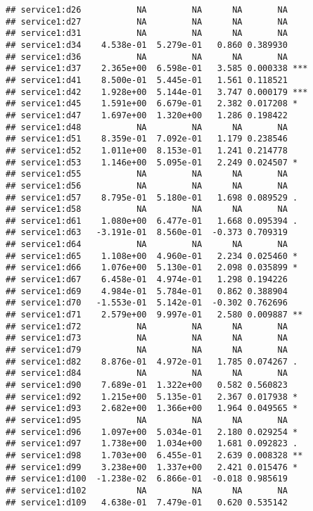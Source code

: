 \documentclass[
]{article}
\begin{document}
\begin{verbatim}
## service1:d26           NA         NA      NA       NA    
## service1:d27           NA         NA      NA       NA    
## service1:d31           NA         NA      NA       NA    
## service1:d34    4.538e-01  5.279e-01   0.860 0.389930    
## service1:d36           NA         NA      NA       NA    
## service1:d37    2.365e+00  6.598e-01   3.585 0.000338 ***
## service1:d41    8.500e-01  5.445e-01   1.561 0.118521    
## service1:d42    1.928e+00  5.144e-01   3.747 0.000179 ***
## service1:d45    1.591e+00  6.679e-01   2.382 0.017208 *  
## service1:d47    1.697e+00  1.320e+00   1.286 0.198422    
## service1:d48           NA         NA      NA       NA    
## service1:d51    8.359e-01  7.092e-01   1.179 0.238546    
## service1:d52    1.011e+00  8.153e-01   1.241 0.214778    
## service1:d53    1.146e+00  5.095e-01   2.249 0.024507 *  
## service1:d55           NA         NA      NA       NA    
## service1:d56           NA         NA      NA       NA    
## service1:d57    8.795e-01  5.180e-01   1.698 0.089529 .  
## service1:d58           NA         NA      NA       NA    
## service1:d61    1.080e+00  6.477e-01   1.668 0.095394 .  
## service1:d63   -3.191e-01  8.560e-01  -0.373 0.709319    
## service1:d64           NA         NA      NA       NA    
## service1:d65    1.108e+00  4.960e-01   2.234 0.025460 *  
## service1:d66    1.076e+00  5.130e-01   2.098 0.035899 *  
## service1:d67    6.458e-01  4.974e-01   1.298 0.194226    
## service1:d69    4.984e-01  5.784e-01   0.862 0.388904    
## service1:d70   -1.553e-01  5.142e-01  -0.302 0.762696    
## service1:d71    2.579e+00  9.997e-01   2.580 0.009887 ** 
## service1:d72           NA         NA      NA       NA    
## service1:d73           NA         NA      NA       NA    
## service1:d79           NA         NA      NA       NA    
## service1:d82    8.876e-01  4.972e-01   1.785 0.074267 .  
## service1:d84           NA         NA      NA       NA    
## service1:d90    7.689e-01  1.322e+00   0.582 0.560823    
## service1:d92    1.215e+00  5.135e-01   2.367 0.017938 *  
## service1:d93    2.682e+00  1.366e+00   1.964 0.049565 *  
## service1:d95           NA         NA      NA       NA    
## service1:d96    1.097e+00  5.034e-01   2.180 0.029254 *  
## service1:d97    1.738e+00  1.034e+00   1.681 0.092823 .  
## service1:d98    1.703e+00  6.455e-01   2.639 0.008328 ** 
## service1:d99    3.238e+00  1.337e+00   2.421 0.015476 *  
## service1:d100  -1.238e-02  6.866e-01  -0.018 0.985619    
## service1:d102          NA         NA      NA       NA    
## service1:d109   4.638e-01  7.479e-01   0.620 0.535142    

\end{verbatim}
\end{document}
